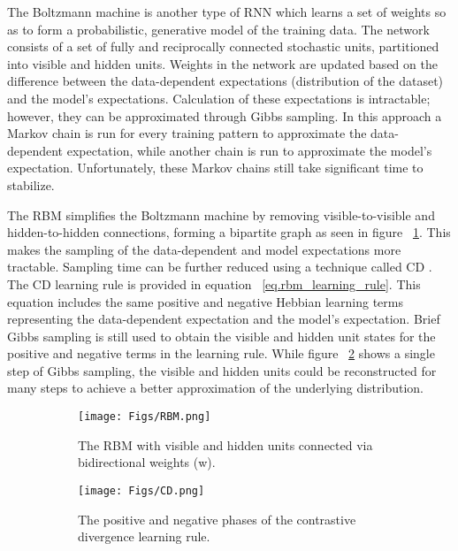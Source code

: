 The Boltzmann machine \citep{boltzmann_machine} is another 
type of \ac{RNN} which learns a set of weights so as to 
form a probabilistic, generative model of the training data. 
The network consists of a set of fully and reciprocally connected stochastic units, 
partitioned into visible and hidden units.
Weights in the network are updated based on the difference 
between the data-dependent expectations (distribution of the dataset) 
and the model's expectations.
Calculation of these expectations is intractable; however, they can be 
approximated through Gibbs sampling.
In this approach a Markov chain is run for every training pattern to 
approximate the data-dependent expectation, while another chain 
is run to approximate the model's expectation.
Unfortunately, these Markov chains still take significant time to stabilize.

The \ac{RBM} simplifies the Boltzmann machine by removing 
visible-to-visible and hidden-to-hidden connections, forming 
a bipartite graph as seen in figure ~\ref{fig:rbm}.
This makes the sampling of the data-dependent and model expectations 
more tractable.
Sampling time can be further reduced using a technique called \ac{CD}
\citep{hinton-cd,contrastive_divergence}.
The CD learning rule is provided in equation ~\ref{eq.rbm_learning_rule}. 
This equation includes the same positive and negative Hebbian learning terms 
representing the data-dependent expectation and the model's expectation. 
Brief Gibbs sampling is still used to obtain the visible and hidden 
unit states for the positive and negative
terms in the learning rule.
While figure ~\ref{fig:cd} shows a single step of Gibbs sampling, the 
visible and hidden units could be reconstructed for many steps to achieve 
a better approximation of the underlying distribution.

\begin{figure}[!h]
\centering
\begin{subfigure}[b]{0.38\textwidth}
	\texttt{[image: Figs/RBM.png]}
	\caption{The \ac{RBM} with visible and hidden units connected via bidirectional weights (w).}
	\label{fig:rbm}
\end{subfigure}
\hfill
\begin{subfigure}[b]{0.52\textwidth}
	\texttt{[image: Figs/CD.png]}
	\caption{The positive and negative phases of the contrastive divergence learning rule.}
	\label{fig:cd}
\end{subfigure}
\label{fig:rbms}
\caption{}
\end{figure}

